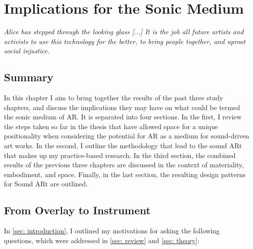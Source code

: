 \chapter{Implications for the Sonic Medium}
\label{sec: discussion}
\epigraph{\emph{Alice has stepped through the looking glass [...] It is the job all future artists and activists to use this technology for the better, to bring people together, and uproot social injustice.}}{\citep[]{skwarek2018}}
\clearpage
\section{Summary}\label{sec: discussion-summary}
In this chapter I aim to bring together the results of the past three study chapters, and discuss the implications they may have on what could be termed the sonic medium of AR. It is separated into four sections. In the first, I review the steps taken so far in the thesis that have allowed space for a unique positionality when considering the potential for AR as a medium for sound-driven art works. In the second, I outline the methodology that lead to the sound ARt that makes up my practice-based research. In the third section, the combined results of the previous three chapters are discussed in the context of materiality, embodiment, and space. Finally, in the last section, the resulting design patterns for Sound ARt are outlined.
\section{From Overlay to Instrument} \label{sec: discussion-review}
In \autoref{sec: introduction}, I outlined my motivations for asking the following questions, which were addressed in \autoref{sec: review} and \autoref{sec: theory}: 

\begin{itemize}
    \RQgenealogy
    \RQtheory
\end{itemize}

